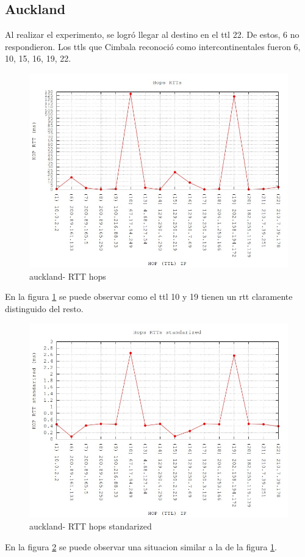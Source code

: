 \subsection{Auckland}

Al realizar el experimento, se logró llegar al destino en el ttl 22. De estos, 6 no respondieron. Los ttls que Cimbala reconoció como intercontinentales fueron 6, 10, 15, 16, 19, 22.

\begin{figure}[!htbp]
  \centering
    \includegraphics[scale=0.6]{imagenes/auckland-graficos/traceroute-auckland.jpg}
  \caption{auckland- RTT hops}
  \label{fig:7}
\end{figure}

En la figura \ref{fig:7} se puede observar como el ttl 10 y 19 tienen un rtt claramente distinguido del resto.

\begin{figure}[!htbp]
  \centering
    \includegraphics[scale=0.6]{imagenes/auckland-graficos/traceroute-auckland-standarized.jpg}
  \caption{auckland- RTT hops standarized}
  \label{fig:8}
\end{figure}

En la figura \ref{fig:8} se puede observar una situacion similar a la de la figura \ref{fig:7}.


